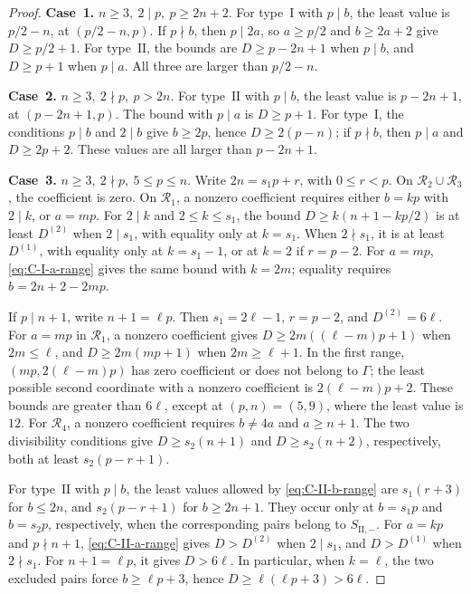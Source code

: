 \documentclass[11pt,a4paper]{amsart}
\theoremstyle{plain}
\numberwithin{equation}{section}
\newenvironment{pf}{\begin{proof}}{\end{proof}}
\begin{document}
\begin{pf}
	\smallskip
	
	\noindent\textbf{Case~1.} \(n\ge3,\ 2\mid p,\ p\ge2n+2\).
	For type~\(\mathrm I\) with \(p\mid b\), the least value is
	\(p/2-n\), at \((p/2-n,p)\). If \(p\nmid b\), then
	\(p\mid2a\), so \(a\ge p/2\) and \(b\ge2a+2\) give
	\(D\ge p/2+1\). For type~\(\mathrm{II}\), the bounds are
	\(D\ge p-2n+1\) when \(p\mid b\), and \(D\ge p+1\)
	when \(p\mid a\). All three are larger than \(p/2-n\).
	
	\smallskip
	
	\noindent\textbf{Case~2.} \(n\ge3,\ 2\nmid p,\ p>2n\).
	For type~\(\mathrm{II}\) with \(p\mid b\), the least value is
	\(p-2n+1\), at \((p-2n+1,p)\). The bound with \(p\mid a\)
	is \(D\ge p+1\). For type~\(\mathrm I\), the conditions
	\(p\mid b\) and \(2\mid b\) give \(b\ge2p\), hence
	\(D\ge2(p-n)\); if \(p\nmid b\), then \(p\mid a\) and
	\(D\ge2p+2\). These values are all larger than \(p-2n+1\).
	
	\smallskip
	
	\noindent\textbf{Case~3.} \(n\ge3,\ 2\nmid p,\ 5\le p\le n\).
	Write \(2n=s_1p+r\), with \(0\le r<p\). On
	\(\mathcal R_2\cup\mathcal R_3\), the coefficient is zero.
	On \(\mathcal R_1\), a nonzero coefficient requires either
	\(b=kp\) with \(2\mid k\), or \(a=mp\).
	For \(2\mid k\) and \(2\le k\le s_1\), the bound
	\(D\ge k(n+1-kp/2)\) is at least \(D^{(2)}\) when
	\(2\mid s_1\), with equality only at \(k=s_1\).
	When \(2\nmid s_1\), it is at least \(D^{(1)}\), with equality
	only at \(k=s_1-1\), or at \(k=2\) if \(r=p-2\).
	For \(a=mp\), \eqref{eq:C-I-a-range} gives the same bound with
	\(k=2m\); equality requires \(b=2n+2-2mp\).
	
	If \(p\mid n+1\), write \(n+1=\ell p\). Then
	\(s_1=2\ell-1\), \(r=p-2\), and \(D^{(2)}=6\ell\).
	For \(a=mp\) in \(\mathcal R_1\), a nonzero coefficient gives
	\(D\ge2m((\ell-m)p+1)\) when \(2m\le\ell\), and
	\(D\ge2m(mp+1)\) when \(2m\ge\ell+1\).
	In the first range, \((mp,2(\ell-m)p)\) has zero coefficient
	or does not belong to \(\Gamma\); the least possible second
	coordinate with a nonzero coefficient is \(2(\ell-m)p+2\).
	These bounds are greater than \(6\ell\), except at
	\((p,n)=(5,9)\), where the least value is \(12\).
	For \(\mathcal R_4\), a nonzero coefficient requires
	\(b\ne4a\) and \(a\ge n+1\). The two divisibility conditions give
	\(D\ge s_2(n+1)\) and \(D\ge s_2(n+2)\), respectively, both
	at least \(s_2(p-r+1)\).
	
	For type~\(\mathrm{II}\) with \(p\mid b\), the least values
	allowed by \eqref{eq:C-II-b-range} are \(s_1(r+3)\) for
	\(b\le2n\), and \(s_2(p-r+1)\) for \(b\ge2n+1\).
	They occur only at \(b=s_1p\) and \(b=s_2p\), respectively,
	when the corresponding pairs belong to \(S_{\mathrm{II},-}\).
	For \(a=kp\) and \(p\nmid n+1\), \eqref{eq:C-II-a-range}
	gives \(D>D^{(2)}\) when \(2\mid s_1\), and
	\(D>D^{(1)}\) when \(2\nmid s_1\).
	For \(n+1=\ell p\), it gives \(D>6\ell\). In particular,
	when \(k=\ell\), the two excluded pairs force
	\(b\ge\ell p+3\), hence \(D\ge\ell(\ell p+3)>6\ell\).
	

\end{pf}
\end{document}
